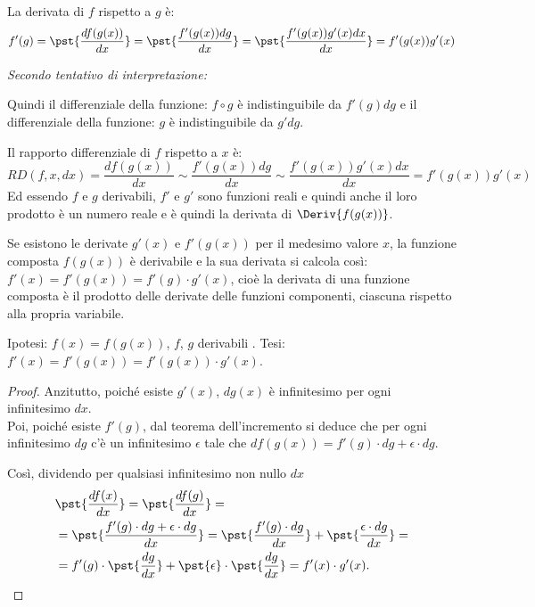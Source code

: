 \begin{esempio}
La derivata di \(f\) rispetto a \(g\) è: 
\[f'(g) = \pst{\dfrac{df(g(x))}{dx}} = 
          \pst{\dfrac{f'(g(x)) dg}{dx}} = 
          \pst{\dfrac{f'(g(x)) g'(x) dx}{dx}} = f'(g(x)) g'(x)\]

\emph{Secondo tentativo di interpretazione:}

Quindi il differenziale della funzione: \(f \circ g\) 
è indistinguibile da \(f'(g)dg\) e 
il differenziale della funzione: \(g\) 
è indistinguibile da \(g'dg\). 

Il rapporto differenziale di \(f\) rispetto a \(x\) è: 
\[RD(f, x, dx) = \dfrac{df(g(x))}{dx} \sim 
          \dfrac{f'(g(x)) dg}{dx} \sim 
          \dfrac{f'(g(x)) g'(x) dx}{dx} = f'(g(x)) g'(x)\]
Ed essendo \(f\) e \(g\) derivabili, \(f'\) e \(g'\) sono funzioni reali
e quindi anche il loro prodotto è un numero reale e è quindi la derivata 
di \(\Deriv{f(g(x))}\).



\end{esempio}

\begin{teorema}
\label{teo:diff01_dericomp}
Se esistono le derivate \(g'(x)\) e \(f'(g(x))\) per il medesimo valore 
\(x\), la funzione composta \(f(g(x))\) è derivabile e la sua derivata si 
calcola così: \(f'(x)=f'(g(x))=f'(g)\cdot g'(x)\), 
cioè la derivata di una funzione composta è il prodotto delle derivate 
delle funzioni componenti, ciascuna rispetto alla propria variabile.
\end{teorema}
\noindent Ipotesi: \(f(x)=f(g(x))\), \(f\), \(g\) derivabili .\tab 
Tesi: \(f'(x)=f'(g(x))=f'(g(x))\cdot g'(x)\).

\begin{proof}

Anzitutto, poiché esiste \(g'(x)\), \(dg(x)\) è infinitesimo per ogni 
infinitesimo \(dx \).\\
Poi, poiché esiste \(f'(g)\), dal teorema dell'incremento si deduce che per 
ogni 
infinitesimo \(dg\) c'è un infinitesimo \(\epsilon\) tale che 
\(df(g(x))=f'(g)\cdot dg + \epsilon\cdot dg.\)

Così, dividendo per qualsiasi infinitesimo non nullo \(dx\)
 \begin{align*}
 &\pst{\frac{df(x)}{dx}}
 =\pst{\frac{df(g)}{dx}}=\\
 &=\pst{\frac{f'(g)\cdot dg + \epsilon\cdot dg}{d x}}=
 \pst{\frac{f'(g)\cdot dg}{d x}}+ \pst{\frac{\epsilon\cdot dg}{dx}}=\\
 &= f'(g)\cdot \pst{\frac{dg}{dx}}+ \pst{\epsilon}\cdot\pst{\frac{dg}{dx}}=
 f'(x)\cdot g'(x).
\end{align*}
\end{proof}

